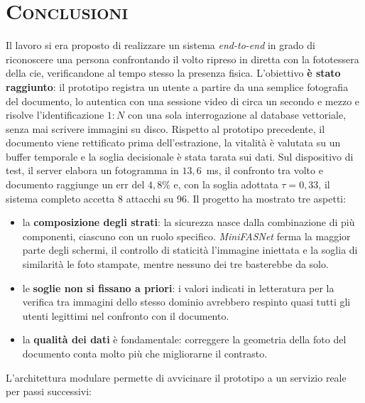 \chapter{\scshape Conclusioni}\label{cap:conclusioni}

Il lavoro si era proposto di realizzare un sistema \textit{end-to-end} in grado di riconoscere una persona confrontando il volto ripreso in diretta con la fototessera della \gls{cie}, verificandone al tempo stesso la presenza fisica.
L'obiettivo \textbf{è stato raggiunto}: il prototipo registra un utente a partire da una semplice fotografia del documento, lo autentica con una sessione video di circa un secondo e mezzo e risolve l'identificazione $1{:}N$ con una sola interrogazione al database vettoriale, senza mai scrivere immagini su disco.
Rispetto al prototipo precedente, il documento viene rettificato prima dell'estrazione, la vitalità è valutata su un buffer temporale e la soglia decisionale è stata tarata sui dati.
Sul dispositivo di test, il server elabora un fotogramma in $13{,}6$~ms, il confronto tra volto e documento raggiunge un \gls{err} del $4{,}8\%$ e, con la soglia adottata $\tau = 0{,}33$, il sistema completo accetta 8 attacchi su 96.
Il progetto ha mostrato tre aspetti:
\begin{itemize}
    \item la \textbf{composizione degli strati}: la sicurezza nasce dalla combinazione di più componenti, ciascuno con un ruolo specifico. \textit{MiniFASNet} ferma la maggior parte degli schermi, il controllo di staticità l'immagine iniettata e la soglia di similarità le foto stampate, mentre nessuno dei tre basterebbe da solo.
    \item le \textbf{soglie non si fissano a priori}: i valori indicati in letteratura per la verifica tra immagini dello stesso dominio avrebbero respinto quasi tutti gli utenti legittimi nel confronto con il documento.
    \item la \textbf{qualità dei dati} è fondamentale: correggere la geometria della foto del documento conta molto più che migliorarne il contrasto.
\end{itemize}
L'architettura modulare permette di avvicinare il prototipo a un servizio reale per passi successivi:
